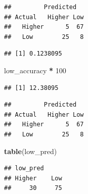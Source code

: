 \documentclass[
]{article}
\newenvironment{Shaded}{\begin{snugshade}}{\end{snugshade}}
\newcommand{\AttributeTok}[1]{\textcolor[rgb]{0.13,0.29,0.53}{#1}}
\newcommand{\DecValTok}[1]{\textcolor[rgb]{0.00,0.00,0.81}{#1}}
\newcommand{\FunctionTok}[1]{\textcolor[rgb]{0.13,0.29,0.53}{\textbf{#1}}}
\newcommand{\NormalTok}[1]{#1}
\newcommand{\OtherTok}[1]{\textcolor[rgb]{0.56,0.35,0.01}{#1}}
\newcommand{\SpecialCharTok}[1]{\textcolor[rgb]{0.81,0.36,0.00}{\textbf{#1}}}
\begin{document}
\begin{verbatim}
##         Predicted
## Actual   Higher Low
##   Higher      5  67
##   Low        25   8
\end{verbatim}

\begin{Shaded}
\end{Shaded}

\begin{verbatim}
## [1] 0.1238095
\end{verbatim}

\begin{Shaded}
\begin{Highlighting}[]
\NormalTok{low\_accuracy }\SpecialCharTok{*} \DecValTok{100}
\end{Highlighting}
\end{Shaded}

\begin{verbatim}
## [1] 12.38095
\end{verbatim}

\begin{Shaded}
\end{Shaded}

\begin{verbatim}
##         Predicted
## Actual   Higher Low
##   Higher      5  67
##   Low        25   8
\end{verbatim}

\begin{Shaded}
\begin{Highlighting}[]
\FunctionTok{table}\NormalTok{(low\_pred)}
\end{Highlighting}
\end{Shaded}

\begin{verbatim}
## low_pred
## Higher    Low 
##     30     75
\end{verbatim}
\end{document}
